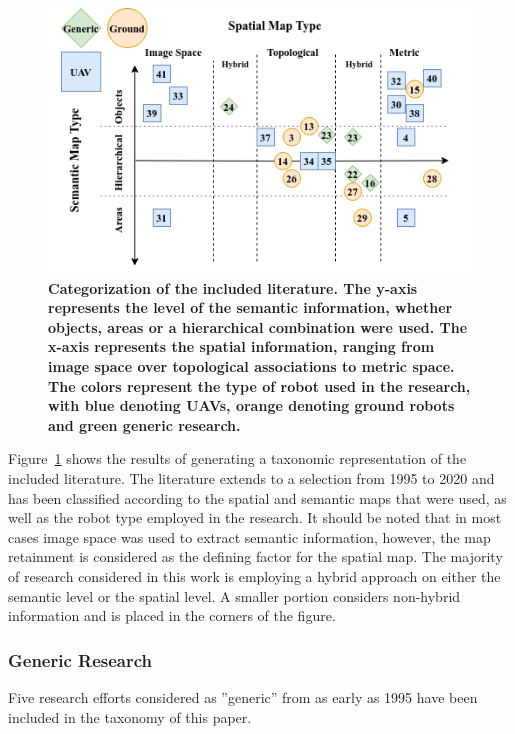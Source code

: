 \documentclass[twocolumn,letterpaper]{IEEEAerospaceCLS}  %
\begin{document}
\begin{figure}
    \centering
    \includegraphics[width=\textwidth]{Lit-15-TNR.png}
    \caption{\bf{
        Categorization of the included literature. The y-axis represents the level of the semantic information, whether objects, areas or a hierarchical combination were used. The x-axis represents the spatial information, ranging from image space over topological associations to metric space. The colors represent the type of robot used in the research, with blue denoting UAVs, orange denoting ground robots and green generic research.
    }}
    \label{fig:LitRes}
\end{figure}
Figure~\ref{fig:LitRes} shows the results of generating a taxonomic representation of the included literature. The literature extends to a selection from 1995 to 2020 and has been classified according to the spatial and semantic maps that were used, as well as the robot type employed in the research. It should be noted that in most cases image space was used to extract semantic information, however, the map retainment is considered as the defining factor for the spatial map. The majority  of research considered in this work is employing a hybrid approach on either the semantic level or the spatial level. A smaller portion considers non-hybrid information and is placed in the corners of the figure.  
\subsubsection{Generic Research} \label{sssec:LitResHis}
Five research efforts considered as ''generic'' from as early as 1995  have been included in the taxonomy of this paper.
\end{document}
